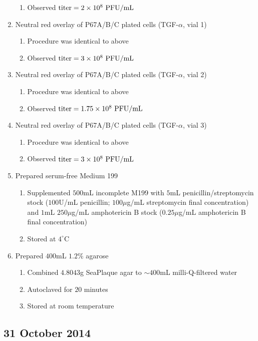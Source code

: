 \begin{enumerate}
\begin{enumerate}
			\item Observed $\text{titer}=2\times 10^{8}\text{ PFU/mL}$
		\end{enumerate}
	\item Neutral red overlay of P67A/B/C plated cells (TGF-$\alpha$, vial 1)
		\begin{enumerate}
			\item Procedure was identical to above
			\item Observed $\text{titer}=3\times 10^{8}\text{ PFU/mL}$
		\end{enumerate}
	\item Neutral red overlay of P67A/B/C plated cells (TGF-$\alpha$, vial 2)
		\begin{enumerate}
			\item Procedure was identical to above
			\item Observed $\text{titer}=1.75\times 10^{8}\text{ PFU/mL}$
		\end{enumerate}
	\item Neutral red overlay of P67A/B/C plated cells (TGF-$\alpha$, vial 3)
		\begin{enumerate}
			\item Procedure was identical to above
			\item Observed $\text{titer}=3\times 10^{8}\text{ PFU/mL}$
		\end{enumerate}
	\item Prepared serum-free Medium 199
		\begin{enumerate}
			\item Supplemented $500$mL incomplete M199 with $5$mL penicillin/streptomycin stock ($100$U/mL penicillin; $100\mu$g/mL streptomycin final concentration) and $1$mL $250\mu$g/mL amphotericin B stock ($0.25\mu$g/mL amphotericin B final concentration)
			\item Stored at $4^{\circ}$C
		\end{enumerate}
	\item Prepared $400$mL $1.2$\% agarose
		\begin{enumerate}
			\item Combined $4.8043$g SeaPlaque agar to $\sim 400$mL milli-Q-filtered water
			\item Autoclaved for $20$ minutes
			\item Stored at room temperature
		\end{enumerate}
\end{enumerate}

\subsection*{31 October 2014}

